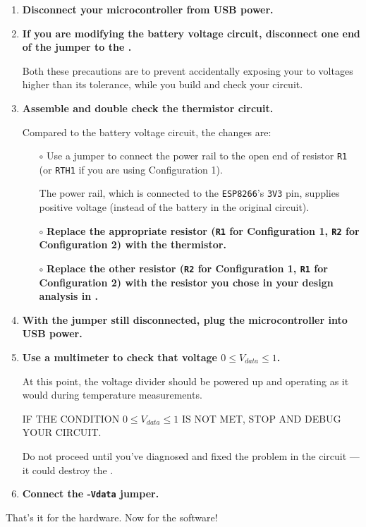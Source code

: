 \begin{enumerate}
	\item \textbf{Disconnect your microcontroller from USB power.}

	\item \textbf{If you are modifying the battery voltage circuit, disconnect one end of the jumper to the \adc.}

	Both these precautions are to prevent accidentally exposing your \adc to voltages higher than its tolerance, while you build and check your circuit.

	\item \textbf{Assemble and double check the thermistor circuit.}

Compared to the battery voltage circuit, the changes are:
	\begin{itemize}
		\item[$\circ$] Use a jumper to connect the power rail to the open end of resistor \texttt{R1} (or \texttt{RTH1} if you are using Configuration 1).

		The power rail, which is connected to the \texttt{ESP8266}'s \texttt{3V3} pin, supplies positive voltage (instead of the battery in the original circuit).
		\item[$\circ$] \textbf{Replace the appropriate resistor (\texttt{R1} for Configuration 1, \texttt{R2} for Configuration 2) with the thermistor.}
		\item[$\circ$] \textbf{Replace the other resistor (\texttt{R2} for Configuration 1, \texttt{R1} for Configuration 2) with the resistor you chose in your design analysis in .}
	\end{itemize}

	\item \textbf{With the \adc jumper still disconnected, plug the microcontroller into USB power.}

	\item \textbf{Use a multimeter to check that voltage $0 \le V_{data} \le 1$.}

	At this point, the voltage divider should be powered up and operating as it would during temperature measurements.

	\smallskip
	IF THE CONDITION $0 \le V_{data} \le 1$ IS NOT MET, STOP AND DEBUG YOUR CIRCUIT.

	\smallskip
	Do not proceed until you've diagnosed and fixed the problem in the circuit --- it could destroy the \adc.

	\item \textbf{Connect the \adc-\texttt{Vdata} jumper.}

\end{enumerate}
That's it for the hardware.
Now for the software!

